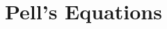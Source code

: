 \documentclass[../../../main.tex]{subfiles}
\begin{document}
\section{Pell's Equations}
\end{document}
